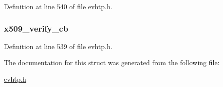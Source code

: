 Definition at line 540 of file evhtp.\-h.

\hypertarget{structevhtp__ssl__cfg__s_afcc514daa3570553ab171826205601c6}{
\subsubsection[{x509\-\_\-verify\-\_\-cb}]{ x509\-\_\-verify\-\_\-cb}}\label{structevhtp__ssl__cfg__s_afcc514daa3570553ab171826205601c6}


Definition at line 539 of file evhtp.\-h.



The documentation for this struct was generated from the following file\-:\begin{DoxyCompactItemize}
\item 
\hyperlink{evhtp_8h}{evhtp.\-h}\end{DoxyCompactItemize}
